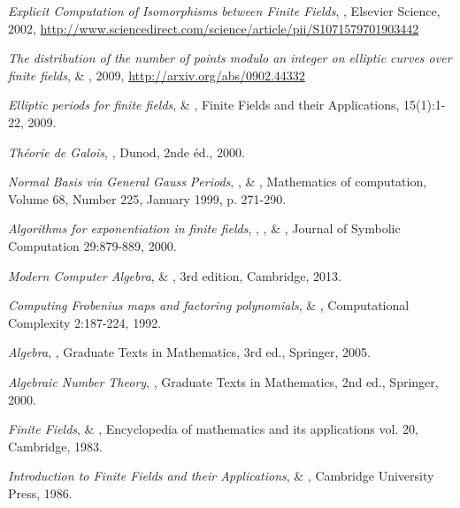 \documentclass[a4paper]{article} %
\numberwithin{section}{part}
\numberwithin{equation}{section}
\begin{document}
\begin{thebibliography}{LC}

 \emph{Explicit Computation of Isomorphisms between Finite
Fields}, , Elsevier Science, 2002, 
\url{http://www.sciencedirect.com/science/article/pii/S1071579701903442}

 \emph{The distribution of the number of points modulo an
integer on elliptic curves over finite fields},  \&
, 2009, \url{http://arxiv.org/abs/0902.44332} 

 \emph{Elliptic periods for finite fields},  \& , Finite Fields and their Applications,
15(1):1-22, 2009.

 \emph{Théorie de Galois}, , Dunod, 2nde
éd., 2000.

 \emph{Normal Basis \textup{via} General Gauss Periods},
,  \& , 
Mathematics of computation, Volume 68, Number 225, January 1999, p. 271-290.

 \emph{Algorithms for exponentiation in finite fields},
, ,  \& 
, Journal of Symbolic Computation 29:879-889, 2000.

 \emph{Modern Computer Algebra},  \&
, 3rd edition, Cambridge, 2013.

 \emph{Computing Frobenius maps and factoring polynomials},
 \& , Computational Complexity
2:187-224, 1992.

 \emph{Algebra}, , Graduate Texts in Mathematics,
3rd ed., Springer, 2005.

 \emph{Algebraic Number Theory}, , Graduate Texts
in Mathematics, 2nd ed., Springer, 2000.

 \emph{Finite Fields},  \& 
, Encyclopedia of mathematics and its applications vol.
20, Cambridge, 1983.

 \emph{Introduction to Finite Fields and their Applications},
 \& , Cambridge University Press,
1986.


\end{thebibliography}
\end{document}

